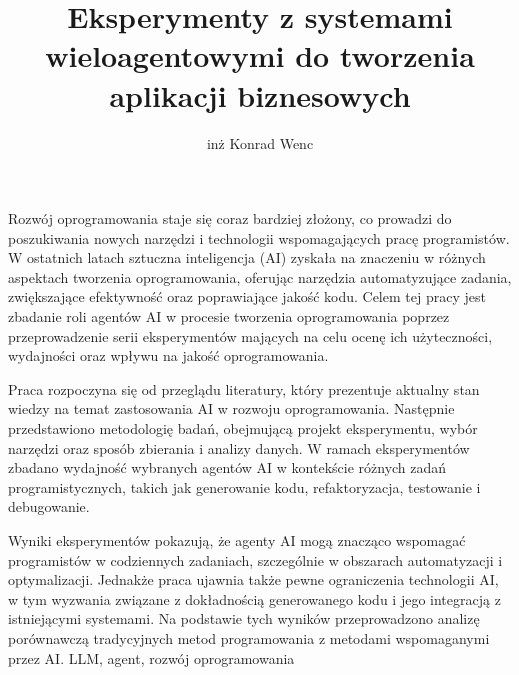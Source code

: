\documentclass[
    left=2.5cm,         %
    right=2.5cm,        %
    top=2.5cm,          %
    bottom=3cm,         %
    bindingoffset=6mm,  %
    nohyphenation=false %
]{ee/ee-thesis}
\begin{document}
\MasterThesis %
{}
\title{
    Eksperymenty z systemami wieloagentowymi do tworzenia aplikacji biznesowych
}
\author{inż Konrad Wenc}
\date{\the\year}
\maketitle

\cleardoublepage
\streszczenie
Rozwój oprogramowania staje się coraz bardziej złożony, co prowadzi do poszukiwania nowych narzędzi i technologii wspomagających pracę programistów. W ostatnich latach sztuczna inteligencja (AI) zyskała na znaczeniu w różnych aspektach tworzenia oprogramowania, oferując narzędzia automatyzujące zadania, zwiększające efektywność oraz poprawiające jakość kodu. Celem tej pracy jest zbadanie roli agentów AI w procesie tworzenia oprogramowania poprzez przeprowadzenie serii eksperymentów mających na celu ocenę ich użyteczności, wydajności oraz wpływu na jakość oprogramowania.

Praca rozpoczyna się od przeglądu literatury, który prezentuje aktualny stan wiedzy na temat zastosowania AI w rozwoju oprogramowania. Następnie przedstawiono metodologię badań, obejmującą projekt eksperymentu, wybór narzędzi oraz sposób zbierania i analizy danych. W ramach eksperymentów zbadano wydajność wybranych agentów AI w kontekście różnych zadań programistycznych, takich jak generowanie kodu, refaktoryzacja, testowanie i debugowanie.

Wyniki eksperymentów pokazują, że agenty AI mogą znacząco wspomagać programistów w codziennych zadaniach, szczególnie w obszarach automatyzacji i optymalizacji. Jednakże praca ujawnia także pewne ograniczenia technologii AI, w tym wyzwania związane z dokładnością generowanego kodu i jego integracją z istniejącymi systemami. Na podstawie tych wyników przeprowadzono analizę porównawczą tradycyjnych metod programowania z metodami wspomaganymi przez AI.
\slowakluczowe LLM, agent, rozwój oprogramowania
\end{document}
